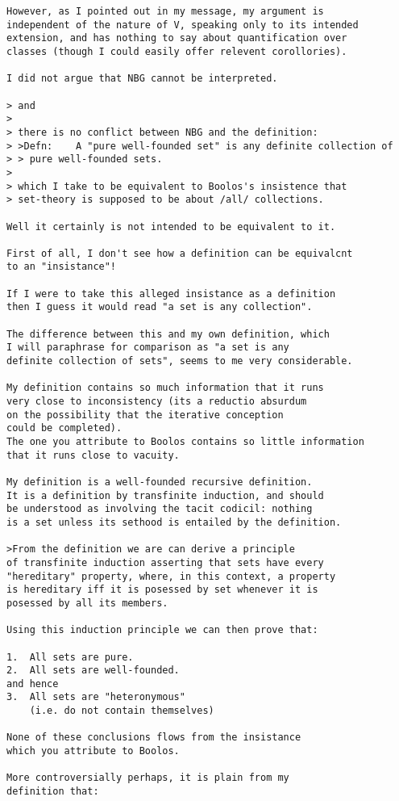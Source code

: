 \documentclass[numreferences]{rbjk}
\begin{document}
\begin{article}
\begin{verbatim}
However, as I pointed out in my message, my argument is
independent of the nature of V, speaking only to its intended
extension, and has nothing to say about quantification over
classes (though I could easily offer relevent corollories).

I did not argue that NBG cannot be interpreted.

> and
>
> there is no conflict between NBG and the definition:
> >Defn:	A "pure well-founded set" is any definite collection of
> > pure well-founded sets.
>
> which I take to be equivalent to Boolos's insistence that
> set-theory is supposed to be about /all/ collections.

Well it certainly is not intended to be equivalent to it.

First of all, I don't see how a definition can be equivalcnt
to an "insistance"!

If I were to take this alleged insistance as a definition
then I guess it would read "a set is any collection".

The difference between this and my own definition, which
I will paraphrase for comparison as "a set is any
definite collection of sets", seems to me very considerable.

My definition contains so much information that it runs
very close to inconsistency (its a reductio absurdum
on the possibility that the iterative conception
could be completed).
The one you attribute to Boolos contains so little information
that it runs close to vacuity.

My definition is a well-founded recursive definition.
It is a definition by transfinite induction, and should
be understood as involving the tacit codicil: nothing
is a set unless its sethood is entailed by the definition.

>From the definition we are can derive a principle
of transfinite induction asserting that sets have every
"hereditary" property, where, in this context, a property
is hereditary iff it is posessed by set whenever it is
posessed by all its members.

Using this induction principle we can then prove that:

1.  All sets are pure.
2.  All sets are well-founded.
and hence
3.  All sets are "heteronymous"
	(i.e. do not contain themselves) 

None of these conclusions flows from the insistance
which you attribute to Boolos.

More controversially perhaps, it is plain from my
definition that:


\end{verbatim}
\end{article}
\end{document}
